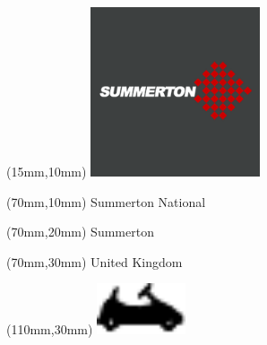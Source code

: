 \null\newpage
\begin{textblock*}{50mm}(15mm,10mm)%
\includegraphics[width=50mm]{LG/SUMM.png}
\end{textblock*}
\begin{textblock*}{130mm}(70mm,10mm)%
{\fontsize{20}{20}\selectfont Summerton National}\\
\end{textblock*}
\begin{textblock*}{120mm}(70mm,20mm)%
{\fontsize{16}{16}\selectfont Summerton}\\
\end{textblock*}
\begin{textblock*}{120mm}(70mm,30mm)%
{\fontsize{12}{12}\selectfont United Kingdom}
\end{textblock*}
\begin{textblock*}{30mm}(110mm,30mm)%
\centering
\includegraphics[height=15mm]{icons/kart.pdf}
\end{textblock*}
